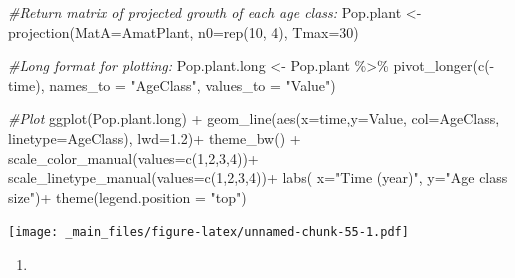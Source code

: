 \documentclass[
]{book}
\newenvironment{Shaded}{\begin{snugshade}}{\end{snugshade}}
\newcommand{\AttributeTok}[1]{\textcolor[rgb]{0.77,0.63,0.00}{#1}}
\newcommand{\CommentTok}[1]{\textcolor[rgb]{0.56,0.35,0.01}{\textit{#1}}}
\newcommand{\DecValTok}[1]{\textcolor[rgb]{0.00,0.00,0.81}{#1}}
\newcommand{\FloatTok}[1]{\textcolor[rgb]{0.00,0.00,0.81}{#1}}
\newcommand{\FunctionTok}[1]{\textcolor[rgb]{0.00,0.00,0.00}{#1}}
\newcommand{\NormalTok}[1]{#1}
\newcommand{\OtherTok}[1]{\textcolor[rgb]{0.56,0.35,0.01}{#1}}
\newcommand{\SpecialCharTok}[1]{\textcolor[rgb]{0.00,0.00,0.00}{#1}}
\newcommand{\StringTok}[1]{\textcolor[rgb]{0.31,0.60,0.02}{#1}}
\providecommand{\tightlist}{%
  \setlength{\itemsep}{0pt}\setlength{\parskip}{0pt}}
\begin{document}
\begin{Shaded}
\begin{Highlighting}[]
\CommentTok{\#Return matrix of projected growth of each age class:}
\NormalTok{Pop.plant }\OtherTok{\textless{}{-}} \FunctionTok{projection}\NormalTok{(}\AttributeTok{MatA=}\NormalTok{AmatPlant, }
                        \AttributeTok{n0=}\FunctionTok{rep}\NormalTok{(}\DecValTok{10}\NormalTok{, }\DecValTok{4}\NormalTok{), }
                        \AttributeTok{Tmax=}\DecValTok{30}\NormalTok{)}
 
\CommentTok{\#Long format for plotting:}
\NormalTok{Pop.plant.long }\OtherTok{\textless{}{-}}\NormalTok{ Pop.plant }\SpecialCharTok{\%\textgreater{}\%} 
  \FunctionTok{pivot\_longer}\NormalTok{(}\FunctionTok{c}\NormalTok{(}\SpecialCharTok{{-}}\NormalTok{time), }
               \AttributeTok{names\_to =} \StringTok{"AgeClass"}\NormalTok{, }
               \AttributeTok{values\_to =} \StringTok{"Value"}\NormalTok{)}

\CommentTok{\#Plot}
\FunctionTok{ggplot}\NormalTok{(Pop.plant.long) }\SpecialCharTok{+} 
  \FunctionTok{geom\_line}\NormalTok{(}\FunctionTok{aes}\NormalTok{(}\AttributeTok{x=}\NormalTok{time,}\AttributeTok{y=}\NormalTok{Value, }\AttributeTok{col=}\NormalTok{AgeClass, }
                \AttributeTok{linetype=}\NormalTok{AgeClass), }\AttributeTok{lwd=}\FloatTok{1.2}\NormalTok{)}\SpecialCharTok{+}
  \FunctionTok{theme\_bw}\NormalTok{() }\SpecialCharTok{+}
  \FunctionTok{scale\_color\_manual}\NormalTok{(}\AttributeTok{values=}\FunctionTok{c}\NormalTok{(}\DecValTok{1}\NormalTok{,}\DecValTok{2}\NormalTok{,}\DecValTok{3}\NormalTok{,}\DecValTok{4}\NormalTok{))}\SpecialCharTok{+} 
  \FunctionTok{scale\_linetype\_manual}\NormalTok{(}\AttributeTok{values=}\FunctionTok{c}\NormalTok{(}\DecValTok{1}\NormalTok{,}\DecValTok{2}\NormalTok{,}\DecValTok{3}\NormalTok{,}\DecValTok{4}\NormalTok{))}\SpecialCharTok{+}
  \FunctionTok{labs}\NormalTok{( }\AttributeTok{x=}\StringTok{"Time (year)"}\NormalTok{, }\AttributeTok{y=}\StringTok{"Age class size"}\NormalTok{)}\SpecialCharTok{+}  
  \FunctionTok{theme}\NormalTok{(}\AttributeTok{legend.position =} \StringTok{"top"}\NormalTok{) }
\end{Highlighting}
\end{Shaded}

\texttt{[image: \_main\_files/figure-latex/unnamed-chunk-55-1.pdf]}

\begin{enumerate}
\def\labelenumi{\arabic{enumi}.}
\setcounter{enumi}{4}
\tightlist
\item
\end{enumerate}
\end{document}

